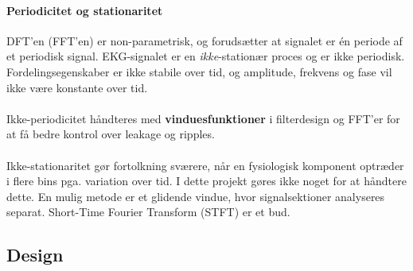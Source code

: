 \documentclass[a4paper]{report}
\begin{document}
\begin{par}

\subsubsection{Periodicitet og stationaritet}
DFT'en (FFT'en) er non-parametrisk, og forudsætter at signalet er én periode af et periodisk signal.
EKG-signalet er en \textit{ikke}-stationær proces og er ikke periodisk.
Fordelingsegenskaber er ikke stabile over tid, og amplitude, frekvens og fase vil ikke være konstante over tid.
\\ \\
Ikke-periodicitet håndteres med \textbf{vinduesfunktioner} i filterdesign og FFT'er for at få bedre kontrol over leakage og ripples.
\\ \\
Ikke-stationaritet gør fortolkning sværere, når en fysiologisk komponent optræder i flere bins pga. variation over tid.
I dette projekt gøres ikke noget for at håndtere dette.
En mulig metode er et glidende vindue, hvor signalsektioner analyseres separat.
Short-Time Fourier Transform (STFT) er et bud.

\end{par} 
\begin{par}

\chapter{Design}

\end{par} 
\end{document}
